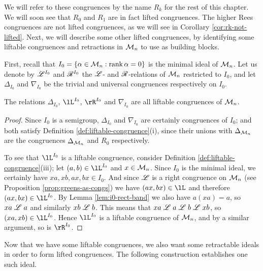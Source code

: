 We will refer to these congruences by the name $R_k$ for the rest of this
chapter.  We will soon see that $R_0$ and $R_1$ are in fact lifted congruences.
The higher Rees congruences are not lifted congruences, as we will see in
Corollary \ref{cor:rk-not-lifted}.  Next, we will describe some other lifted
congruences, by identifying some liftable congruences and retractions in
$\mathcal{M}_n$ to use as building blocks.

First, recall that $I_0 = \{\alpha \in \mathcal{M}_n : \operatorname{rank} \alpha = 0\}$ is the
minimal ideal of $\mathcal{M}_n$.  Let us denote by $\mathrel{\mathscr{L}}^{I_0}$ and $\mathrel{\mathscr{R}}^{I_0}$ the $\mathrel{\mathscr{L}}$- and
$\mathrel{\mathscr{R}}$-relations of $\mathcal{M}_n$ restricted to $I_0$, and let $\Delta_{I_0}$ and
$\nabla_{I_0}$ be the trivial and universal congruences respectively on $I_0$.

\begin{proposition}
  The relations $\Delta_{I_0}$, $\lL^{I_0}$, $\rR^{I_0}$ and $\nabla_{I_0}$ are all
  liftable congruences of $\mathcal{M}_n$.
  \begin{proof}
    Since $I_0$ is a semigroup, $\Delta_{I_0}$ and $\nabla_{I_0}$ are certainly
    congruences of $I_0$; and both satisfy Definition
    \ref{def:liftable-congruence}(i), since their unions with $\Delta_{\mathcal{M}_n}$
    are the congruences $\Delta_{\mathcal{M}_n}$ and $R_0$ respectively.

    To see that $\lL^{I_0}$ is a liftable congruence, consider Definition
    \ref{def:liftable-congruence}(iii); let $(a,b) \in \lL^{I_0}$ and
    $x \in \mathcal{M}_n$.  Since $I_0$ is the minimal ideal, we certainly have
    $xa,xb,ax,bx \in I_0$.  And since $\mathrel{\mathscr{L}}$ is a right congruence on $\mathcal{M}_n$
    (see Proposition \ref{prop:greens-as-congs}) we have $(ax,bx) \in \lL$ and
    therefore $(ax,bx) \in \lL^{I_0}$.  By Lemma \ref{lem:i0-rect-band} we also have
    $a(xa) = a$, so $xa \mathrel{\mathscr{L}} a$ and similarly $xb \mathrel{\mathscr{L}} b$.  This means that
    $xa \mathrel{\mathscr{L}} a \mathrel{\mathscr{L}} b \mathrel{\mathscr{L}} xb$, so $(xa, xb) \in \lL^{I_0}$.  Hence $\lL^{I_0}$ is a
    liftable congruence of $\mathcal{M}_n$, and by a similar argument, so is $\rR^{I_0}$.
  \end{proof}
\end{proposition}

Now that we have some liftable congruences, we also want some retractable ideals
in order to form lifted congruences.  The following construction establishes one
such ideal.


